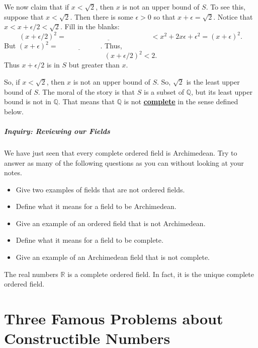 \documentclass[11pt]{article}
\newenvironment{task}
	{\begin{mdframed}[linecolor=lightgray, linewidth=3pt]\raggedright}
	{\end{mdframed}}
\renewcommand\emph[1]{\underline{\bf{#1}}} %
\theoremstyle{definition}
\begin{document}
\begin{task}
  We now claim that
  if $x < \sqrt{2}$, then $x$ is not an upper bound of $S$. To see this, suppose that $x < \sqrt{2}$. Then there is
  some $\epsilon > 0$ so that $x+\epsilon = \sqrt{2}$. Notice that $x < x + \epsilon/2 < \sqrt{2}$. Fill in the blanks:
  \[ (x + \epsilon/2)^2 = \underline{\hspace{2in}} < x^2 + 2x\epsilon + \epsilon^2 = (x+\epsilon)^2. \]
  But $(x+\epsilon)^2 = \underline{\hspace{1in}}$. Thus,
  \[ (x+\epsilon/2)^2 < 2. \]
  Thus $x+\epsilon/2$ is in $S$ but greater than $x$. 
  
  So, if $x<\sqrt{2}$, then $x$ is not an upper bound of $S$. So, $\sqrt{2}$ is the least upper bound of $S$. The moral of the story is
  that $S$ is a subset of $\mathbb{Q}$, but its least upper bound is not in $\mathbb{Q}$. That means that $\mathbb{Q}$ is not \emph{complete}
  in the sense defined below.
\end{task}\newpage

\subsubsection{Inquiry: Reviewing our Fields}

\begin{task}
  We have just seen that every complete ordered field is Archimedean. Try to answer as many of the following questions as you can
  without looking at your notes.
  \begin{itemize}
    \item Give two examples of fields that are not ordered fields.
    \item Define what it means for a field to be Archimedean.
    \item Give an example of an ordered field that is not Archimedean.
    \item Define what it means for a field to be complete.
    \item Give an example of an Archimedean field that is not complete.
  \end{itemize}
  The real numbers $\mathbb{R}$ is a complete ordered field. In fact, it is the unique complete ordered field.
\end{task}

\newpage

\part{Three Famous Problems about Constructible Numbers}
\end{document}
